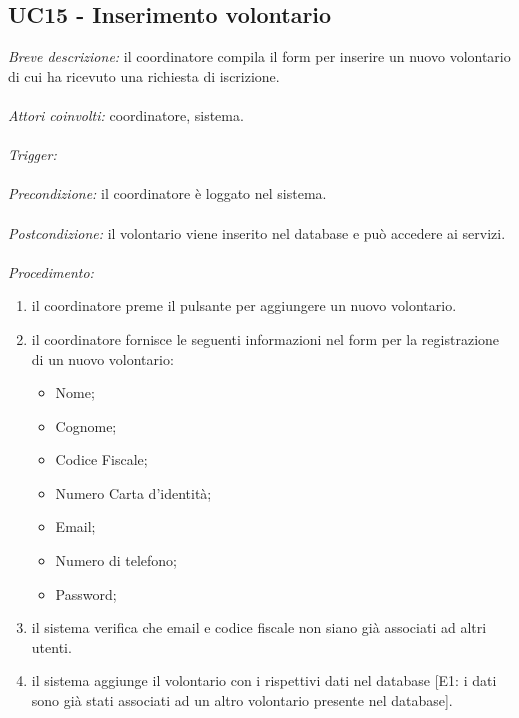 \subsection{UC15 - Inserimento volontario}
\textit{Breve descrizione:} il coordinatore compila il form per inserire un nuovo volontario di cui ha ricevuto una richiesta di iscrizione. 
\\
\\
\textit{Attori coinvolti:} coordinatore, sistema.
\\
\\
\textit{Trigger:}
\\
\\
\textit{Precondizione:} il coordinatore è loggato nel sistema.
\\
\\
\textit{Postcondizione:} il volontario viene inserito nel database e può accedere ai servizi.
\\
\\
\textit{Procedimento:}
\begin{enumerate}
	\item il coordinatore preme il pulsante per aggiungere un nuovo volontario.
	\item il coordinatore fornisce le seguenti informazioni nel form per la registrazione di un nuovo volontario:
	\begin{itemize}
		\item Nome;
		\item Cognome;
		\item Codice Fiscale;
		\item Numero Carta d'identità;
		\item Email;
		\item Numero di telefono;
		\item Password;
	\end{itemize}
	\item il sistema verifica che email e codice fiscale non siano già associati ad altri utenti.
	\item il sistema aggiunge il volontario con i rispettivi dati nel database [E1: i dati sono già stati associati ad un altro volontario presente nel database].
\end{enumerate}



